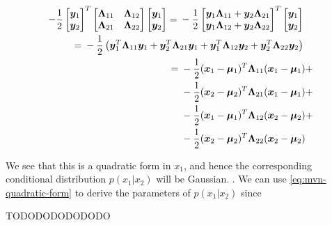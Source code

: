 \begin{align}
\begin{split}
-\frac{1}{2} \begin{bmatrix} \vy_1 \\ \vy_2 \end{bmatrix} ^T \partlambda \begin{bmatrix} \vy_1 \\ \vy_2 \end{bmatrix} ={}& -\frac{1}{2} \begin{bmatrix} \vy_1 \ml{11} + \vy_2 \ml{21} \\ \vy_1 \ml{12} + \vy_2 \ml{22} \end{bmatrix} ^T \begin{bmatrix} \vy_1 \\ \vy_2 \end{bmatrix}
\end{split} \\
%
\begin{split}
={}& -\frac{1}{2} \left( \vy_1^T \ml{11} \vy_1 + \vy_2^T \ml{21} \vy_1 + \vy_1^T \ml{12} \vy_2 + \vy_2^T \ml{22} \vy_2 \right)
\end{split} \\
%
\begin{split}
={}& -\frac{1}{2} (\vx_1 - \vmu_1)^T \ml{11} (\vx_1 - \vmu_1) {}+ \\
  &-\frac{1}{2} (\vx_2 - \vmu_2)^T \ml{21} (\vx_1 - \vmu_1) {}+ \\
  &-\frac{1}{2} (\vx_1 - \vmu_1)^T \ml{12} (\vx_2 - \vmu_2) {}+ \\
  &-\frac{1}{2} (\vx_2 - \vmu_2)^T \ml{22} (\vx_2 - \vmu_2) \label{eq:mvn-quadratic-form}
\end{split}
\end{align}


We see that this is a quadratic form in $x_1$, and hence the corresponding conditional distribution $p(x_1 | x_2)$ will be Gaussian. . We can use \eqref{eq:mvn-quadratic-form} to derive the parameters of $p(x_1 | x_2)$ since


\citep{murphy2012machine}






TODODODODODODO


